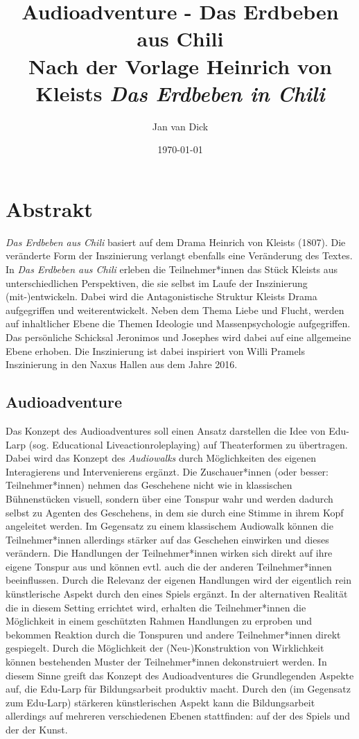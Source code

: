 \documentclass[a4paper, 12pt]{article}
\title{%
    Audioadventure - Das Erdbeben aus Chili \\
    \large Nach der Vorlage Heinrich von Kleists \textit{Das Erdbeben in Chili}}
\author{Jan van Dick}
\date{\today}
\begin{document}
\maketitle

\section{Abstrakt}
\textit{Das Erdbeben aus Chili} basiert auf dem Drama Heinrich von Kleists (1807). 
Die veränderte Form der Inszinierung verlangt ebenfalls eine Veränderung des Textes. 
In \textit{Das Erdbeben aus Chili} erleben die Teilnehmer*innen das Stück Kleists aus unterschiedlichen Perspektiven, die sie selbst im Laufe der Inszinierung (mit-)entwickeln.
Dabei wird die Antagonistische Struktur Kleists Drama aufgegriffen und weiterentwickelt. 
Neben dem Thema Liebe und Flucht, werden auf inhaltlicher Ebene die Themen Ideologie und Massenpsychologie aufgegriffen. 
Das persönliche Schicksal Jeronimos und Josephes wird dabei auf eine allgemeine Ebene erhoben.
Die Inszinierung ist dabei inspiriert von Willi Pramels Inszinierung in den Naxus Hallen aus dem Jahre 2016.

\subsection{Audioadventure}
Das Konzept des \glqq Audioadventures\grqq{} soll einen Ansatz darstellen die Idee von Edu-Larp (sog. Educational Liveactionroleplaying) auf Theaterformen zu übertragen. 
Dabei wird das Konzept des \textit{Audiowalks} durch Möglichkeiten des eigenen Interagierens und Intervenierens ergänzt.
Die Zuschauer*innen (oder besser: Teilnehmer*innen) nehmen das Geschehene nicht wie in klassischen Bühnenstücken visuell, sondern über eine Tonspur wahr und werden dadurch selbst zu Agenten des Geschehens, in dem sie durch eine \glqq Stimme in ihrem Kopf\grqq{} angeleitet werden.
Im Gegensatz zu einem \glqq klassischem\grqq{} Audiowalk können die Teilnehmer*innen allerdings stärker auf das Geschehen einwirken und dieses verändern. 
Die Handlungen der Teilnehmer*innen wirken sich direkt auf ihre eigene Tonspur aus und können evtl. auch die der anderen Teilnehmer*innen beeinflussen.
Durch die Relevanz der eigenen Handlungen wird der eigentlich rein künstlerische Aspekt durch den eines Spiels ergänzt.
In der alternativen Realität die in diesem Setting errichtet wird, erhalten die Teilnehmer*innen die Möglichkeit in einem geschützten Rahmen Handlungen zu erproben und bekommen Reaktion durch die Tonspuren und andere Teilnehmer*innen direkt gespiegelt.
Durch die Möglichkeit der (Neu-)Konstruktion von Wirklichkeit können bestehenden Muster der Teilnehmer*innen dekonstruiert werden.
In diesem Sinne greift das Konzept des Audioadventures die Grundlegenden Aspekte auf, die Edu-Larp für Bildungsarbeit produktiv macht.
Durch den (im Gegensatz zum Edu-Larp) stärkeren künstlerischen Aspekt kann die Bildungsarbeit allerdings auf mehreren verschiedenen Ebenen stattfinden: auf der des Spiels und der der Kunst. 
\end{document}
